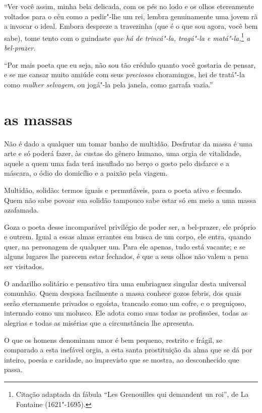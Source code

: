 “Ver você assim, minha bela delicada, com os pés no lodo e
os olhos etereamente voltados para o céu como a pedir"-lhe um rei,
lembra genuinamente uma jovem rã a invocar o ideal. Embora
despreze a travezinha (que é o que sou agora, você bem sabe), tome
tento com o guindaste \textit{que há de trincá"-la, tragá"-la e matá"-la,}\protect\footnote{  Citação 
adaptada da fábula ``Les Grenouilles qui demandent un roi'', 
de La Fontaine (1621"-1695).}
\textit{a bel-prazer.}

“Por mais poeta que eu seja, não sou tão crédulo quanto
você gostaria de pensar, e se me cansar muito amiúde com seus \textit{preciosos}
choramingos, hei de tratá"-la como \textit{mulher selvagem}, ou jogá"-la pela
janela, como garrafa vazia.''

\quebra\section[As massas]{as massas}

Não é dado a qualquer um tomar banho de multidão. Desfrutar da massa é uma
arte e só poderá fazer, às custas do gênero humano, uma orgia de
vitalidade, aquele a quem uma fada terá insuflado no berço o gosto
pelo disfarce e a máscara, o ódio do domicílio e a paixão pela
viagem.

Multidão, solidão: termos iguais e permutáveis, para o poeta ativo e
fecundo. Quem não sabe povoar sua solidão tampouco sabe estar só em
meio a uma massa azafamada.

Goza o poeta desse incomparável privilégio de poder ser, a bel-prazer,
ele próprio e outrem. Igual a essas almas errantes em busca de um corpo,
ele entra, quando quer, na personagem de qualquer um. Para ele apenas, tudo
está vacante; e se alguns lugares lhe parecem estar fechados, é que a
seus olhos não valem a pena ser visitados.

O andarilho solitário e pensativo tira uma embriaguez singular desta
universal comunhão. Quem desposa facilmente a massa conhece gozos
febris, dos quais serão eternamente privados o egoísta, trancado como
um cofre, e o preguiçoso, internado como um molusco. Ele adota como
suas todas as profissões, todas as alegrias e todas as misérias que a
circunstância lhe apresenta.

O que os homens denominam amor é bem pequeno, restrito e frágil, se 
comparado a esta inefável orgia, a esta santa prostituição da alma
que se dá por inteiro, poesia e caridade, ao imprevisto que se mostra, ao
desconhecido que passa.

